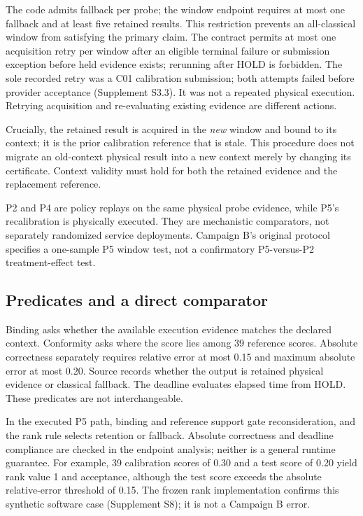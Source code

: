 \documentclass[pdflatex,sn-mathphys-num]{sn-jnl}
\begin{document}
The code admits fallback per probe; the window endpoint requires at most one fallback and at least five retained results. This restriction prevents an all-classical window from satisfying the primary claim. The contract permits at most one acquisition retry per window after an eligible terminal failure or submission exception before held evidence exists; rerunning after HOLD is forbidden. The sole recorded retry was a C01 calibration submission; both attempts failed before provider acceptance (Supplement S3.3). It was not a repeated physical execution. Retrying acquisition and re-evaluating existing evidence are different actions.

Crucially, the retained result is acquired in the \emph{new} window and bound to its context; it is the prior calibration reference that is stale. This procedure does not migrate an old-context physical result into a new context merely by changing its certificate. Context validity must hold for both the retained evidence and the replacement reference.

P2 and P4 are policy replays on the same physical probe evidence, while P5's recalibration is physically executed. They are mechanistic comparators, not separately randomized service deployments. Campaign B's original protocol specifies a one-sample P5 window test, not a confirmatory P5-versus-P2 treatment-effect test.

\subsection{Predicates and a direct comparator}
Binding asks whether the available execution evidence matches the declared context. Conformity asks where the score lies among 39 reference scores. Absolute correctness separately requires relative error at most 0.15 and maximum absolute error at most 0.20. Source records whether the output is retained physical evidence or classical fallback. The deadline evaluates elapsed time from HOLD. These predicates are not interchangeable.

In the executed P5 path, binding and reference support gate reconsideration, and the rank rule selects retention or fallback. Absolute correctness and deadline compliance are checked in the endpoint analysis; neither is a general runtime guarantee. For example, 39 calibration scores of 0.30 and a test score of 0.20 yield rank value 1 and acceptance, although the test score exceeds the absolute relative-error threshold of 0.15. The frozen rank implementation confirms this synthetic software case (Supplement S8); it is not a Campaign B error.
\end{document}
